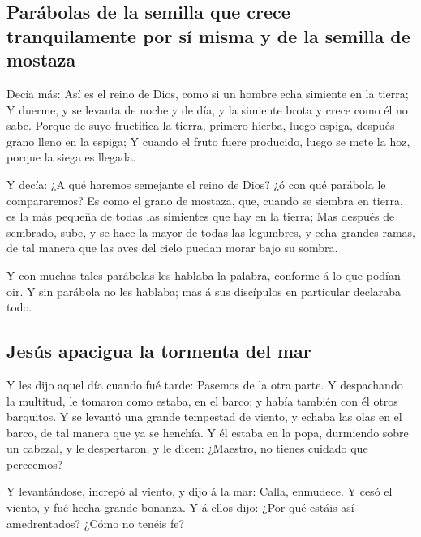 \hypertarget{paruxe1bolas-de-la-semilla-que-crece-tranquilamente-por-suxed-misma-y-de-la-semilla-de-mostaza}{%
\subsection{Parábolas de la semilla que crece tranquilamente por sí
misma y de la semilla de
mostaza}\label{paruxe1bolas-de-la-semilla-que-crece-tranquilamente-por-suxed-misma-y-de-la-semilla-de-mostaza}}

 Decía más: Así es el reino de Dios, como si un hombre
echa simiente en la tierra;  Y duerme, y se levanta de
noche y de día, y la simiente brota y crece como él no sabe.
 Porque de suyo fructifica la tierra, primero hierba,
luego espiga, después grano lleno en la espiga;  Y cuando
el fruto fuere producido, luego se mete la hoz, porque la siega es
llegada.

 Y decía: ¿A qué haremos semejante el reino de Dios? ¿ó
con qué parábola le compararemos?  Es como el grano de
mostaza, que, cuando se siembra en tierra, es la más pequeña de todas
las simientes que hay en la tierra;  Mas después de
sembrado, sube, y se hace la mayor de todas las legumbres, y echa
grandes ramas, de tal manera que las aves del cielo puedan morar bajo su
sombra.

 Y con muchas tales parábolas les hablaba la palabra,
conforme á lo que podían oir.  Y sin parábola no les
hablaba; mas á sus discípulos en particular declaraba todo.

\hypertarget{jesuxfas-apacigua-la-tormenta-del-mar}{%
\subsection{Jesús apacigua la tormenta del
mar}\label{jesuxfas-apacigua-la-tormenta-del-mar}}

 Y les dijo aquel día cuando fué tarde: Pasemos de la
otra parte.  Y despachando la multitud, le tomaron como
estaba, en el barco; y había también con él otros barquitos.
 Y se levantó una grande tempestad de viento, y echaba
las olas en el barco, de tal manera que ya se henchía.  Y
él estaba en la popa, durmiendo sobre un cabezal, y le despertaron, y le
dicen: ¿Maestro, no tienes cuidado que perecemos?

 Y levantándose, increpó al viento, y dijo á la mar:
Calla, enmudece. Y cesó el viento, y fué hecha grande bonanza.
 Y á ellos dijo: ¿Por qué estáis así amedrentados? ¿Cómo
no tenéis fe?

